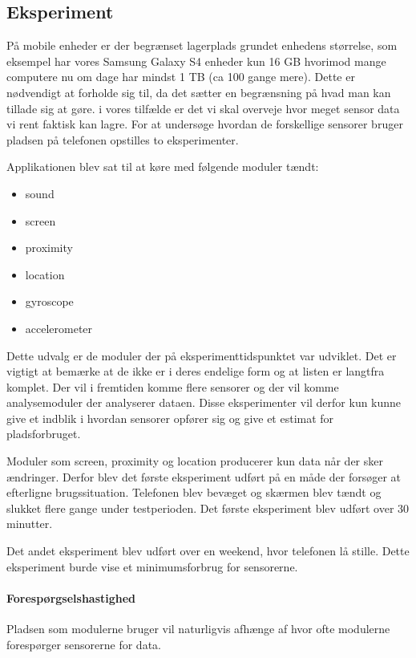 \subsection{Eksperiment}

På mobile enheder er der begrænset lagerplads grundet enhedens størrelse, som eksempel har vores Samsung Galaxy S4 enheder kun 16 GB hvorimod mange computere nu om dage har mindst 1 TB (ca 100 gange mere).
Dette er nødvendigt at forholde sig til, da det sætter en begrænsning på hvad man kan tillade sig at gøre.
i vores tilfælde er det vi skal overveje hvor meget sensor data vi rent faktisk kan lagre.
For at undersøge hvordan de forskellige sensorer bruger pladsen på telefonen opstilles to eksperimenter.

Applikationen blev sat til at køre med følgende moduler tændt:
\begin{itemize}
	\item sound
	\item screen
	\item proximity
	\item location
	\item gyroscope
	\item accelerometer
\end{itemize}

Dette udvalg er de moduler der på eksperimenttidspunktet var udviklet.
Det er vigtigt at bemærke at de ikke er i deres endelige form og at listen er langtfra komplet.
Der vil i fremtiden komme flere sensorer og der vil komme analysemoduler der analyserer dataen.
Disse eksperimenter vil derfor kun kunne give et indblik i hvordan sensorer opfører sig og give et estimat for pladsforbruget.

Moduler som screen, proximity og location producerer kun data når der sker ændringer. 
Derfor blev det første eksperiment udført på en måde der forsøger at efterligne brugssituation. 
Telefonen blev bevæget og skærmen blev tændt og slukket flere gange under testperioden.
Det første eksperiment blev udført over 30 minutter.

Det andet eksperiment blev udført over en weekend, hvor telefonen lå stille.
Dette eksperiment burde vise et minimumsforbrug for sensorerne.

\paragraph{Forespørgselshastighed}
Pladsen som modulerne bruger vil naturligvis afhænge af hvor ofte modulerne forespørger sensorerne for data.


